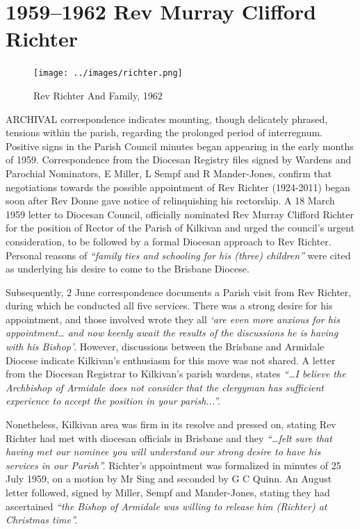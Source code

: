 \printendnotes[custom]
\setcounter{endnote}{0}
\chapter{1959--1962 Rev Murray Clifford Richter}
\nobalance








\begin{figure}
\begin{center}
\texttt{[image: ../images/richter.png]}
\caption{Rev Richter And Family, 1962}
\end{center}
\end{figure}




\lettrine[lines=3]{A}{RCHIVAL}
 correspondence indicates mounting, though delicately phrased, tensions within the parish, regarding the prolonged period of interregnum. Positive signs in the Parish Council minutes began appearing in the early months of 1959. Correspondence from the Diocesan Registry files signed by Wardens and Parochial Nominators, E Miller, L Sempf and R Mander-Jones, confirm that negotiations towards the possible appointment of Rev Richter (1924-2011) began soon after Rev Donne gave notice of relinquishing his rectorship. A 18 March 1959 letter to Diocesan Council, officially nominated Rev Murray Clifford Richter for the position of Rector of the Parish of Kilkivan and urged the council's urgent consideration, to be followed by a formal Diocesan approach to Rev Richter. Personal reasons of \emph{``family ties and schooling for his (three) children''} were cited as underlying his desire to come to the Brisbane Diocese.

Subsequently, 2 June correspondence documents a Parish visit from Rev Richter, during which he conducted all five services. There was a strong desire for his appointment, and those involved wrote they all \emph{`are even more anxious for his appointment\ldots{} and now keenly await the results of the discussions he is having with his Bishop'}. However, discussions between the Brisbane and Armidale Diocese indicate Kilkivan's enthusiasm for this move was not shared. A letter from the Diocesan Registrar to Kilkivan's parish wardens, states \emph{``\ldots I believe the Archbishop of Armidale does not consider that the clergyman has sufficient experience to accept the position in your parish...''.}



Nonetheless, Kilkivan area was firm in its resolve and pressed on, stating Rev Richter had met with diocesan officials in Brisbane and they \emph{``\ldots felt sure that having met our nominee you will understand our strong desire to have his services in our Parish''.} Richter's appointment was formalized in minutes of 25 July 1959, on a motion by Mr Sing and seconded by G C Quinn. An August letter followed, signed by Miller, Sempf and Mander-Jones, stating they had ascertained \emph{``the Bishop of Armidale was willing to release him (Richter) at Christmas time''.}



